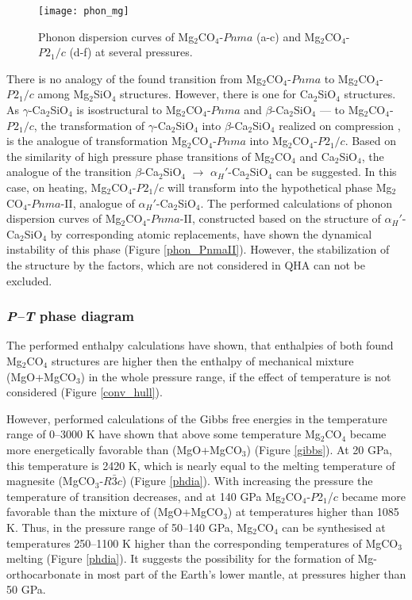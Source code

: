 \documentclass[a4paperm]{article}
\begin{document}
\begin{figure}[H]
	\texttt{[image: phon\_mg]} \centering
	\caption{Phonon dispersion curves of Mg$_2$CO$_4$-$Pnma$ (a-c) and Mg$_2$CO$_4$-$P2_1/c$ (d-f) at several pressures.
	} 	\label{phon_mg2co4_main}
\end{figure}



There is no analogy of the found transition from Mg$_2$CO$_4$-$Pnma$ to Mg$_2$CO$_4$-$P2_1/c$ among Mg$_2$SiO$_4$ structures.
However, there is one for Ca$_2$SiO$_4$ structures.
As $\gamma$-Ca$_2$SiO$_4$ is isostructural to Mg$_2$CO$_4$-$Pnma$ and $\beta$-Ca$_2$SiO$_4$ --- to Mg$_2$CO$_4$-$P2_1/c$, the transformation of $\gamma$-Ca$_2$SiO$_4$ into $\beta$-Ca$_2$SiO$_4$ realized on compression \cite{belmonte2017}, is the analogue of transformation Mg$_2$CO$_4$-$Pnma$ into Mg$_2$CO$_4$-$P2_1/c$. 
Based on the similarity of high pressure phase transitions of Mg$_2$CO$_4$ and Ca$_2$SiO$_4$, the analogue of the transition $\beta$-Ca$_2$SiO$_4$ $\to$ $\alpha_H'$-Ca$_2$SiO$_4$ can be suggested.
In this case, on heating, Mg$_2$CO$_4$-$P2_1/c$ will transform into the hypothetical phase Mg$_2$CO$_4$-$Pnma$-II, analogue of $\alpha_H'$-Ca$_2$SiO$_4$.
The performed calculations of phonon dispersion curves of Mg$_2$CO$_4$-$Pnma$-II, constructed based on the structure of $\alpha_H'$-Ca$_2$SiO$_4$ by corresponding atomic replacements, have shown the dynamical instability of this phase (Figure \ref{phon_PnmaII}).
However, the stabilization of the structure by the factors, which are not considered in QHA can not be excluded.




\subsubsection*{{\it P--T} phase diagram}

The performed enthalpy calculations have shown, that enthalpies of both found Mg$_2$CO$_4$ structures are higher then the enthalpy of mechanical mixture (MgO+MgCO$_3$) in the whole pressure range, if the effect of temperature is not considered (Figure \ref{conv_hull}).

However, performed calculations of the Gibbs free energies in the temperature range of 0--3000 K have shown that above some temperature  Mg$_2$CO$_4$ became more energetically favorable than (MgO+MgCO$_3$) (Figure \ref{gibbs}).
At 20 GPa, this temperature is 2420 K, which is nearly equal to the melting temperature of  magnesite (MgCO$_3$-$R\bar{3}c$) \cite{solopova2015} (Figure \ref{phdia}).
With increasing the pressure the temperature of transition decreases, and at 140 GPa Mg$_2$CO$_4$-$P$2$_1$/$c$ became more favorable than the mixture of (MgO+MgCO$_3$) at temperatures higher than 1085 K.
Thus, in the pressure range of 50--140 GPa, Mg$_2$CO$_4$ can be synthesised at temperatures 250--1100 K higher than the corresponding temperatures of MgCO$_3$ melting (Figure \ref{phdia}). 
It suggests the possibility for the formation of Mg-orthocarbonate in most part of the Earth's lower mantle, at pressures higher than 50 GPa.
\end{document}
